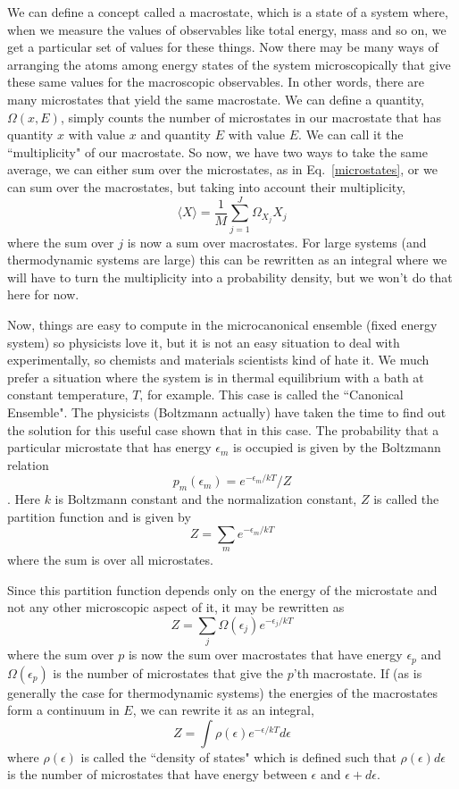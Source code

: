 \documentclass[]{revtex4}
\newcommand{\sm}[1]{{\[#1\]}}
\begin{document}
We can define a concept called a macrostate, which is a state of a system where, when we measure the values of observables like total energy, mass and
so on, we get a particular set of values for these things.  Now there may be many ways of arranging the atoms among energy states of the system
microscopically that give
these same values for the macroscopic observables. In other words, there are many microstates that yield the same macrostate.
We can define a quantity, $\Omega (x,E)$, simply counts the number of microstates in our macrostate
that has quantity $x$ with value $x$ and quantity $E$ with value $E$.  We can call it the ``multiplicity" of our macrostate.  So now,
we have two ways to take the same average, we can either sum over the microstates, as in Eq.~\ref{microstates}, or we can sum over the
macrostates, but taking into account their multiplicity,
\sm{\langle X\rangle=\frac{1}{M}{\sum_{j=1}^{J} \Omega_{X_j} X_j}\label{microstates}}
where the sum over $j$ is now a sum over macrostates.  For large systems (and thermodynamic systems are large) this can be rewritten as
an integral where we will have to turn the multiplicity into a probability density, but we won't do that here for now.

Now, things are easy to compute in the microcanonical ensemble (fixed energy system) so physicists love it,  but it is not
an easy situation to deal with experimentally, so chemists and materials scientists kind of hate it.
We much prefer a situation where the system is in thermal equilibrium with a bath at constant temperature, $T$, for example.
This case is called the ``Canonical Ensemble".  The physicists (Boltzmann actually) have taken the time to find out the solution for this
useful case shown that in this case. The probability that a particular microstate that has energy $\epsilon_m$ is
occupied is given by the Boltzmann relation
\sm{p_m(\epsilon_m)=e^{-\epsilon_m/kT}/Z}.
Here $k$ is Boltzmann constant and the normalization constant, $Z$ is called the partition function and is given by
\sm{Z = \sum_m e^{-\epsilon_m/kT}}
where the sum is over all microstates.

Since this partition function depends only on the energy of the microstate and not any other microscopic aspect of it, it may be rewritten as
\sm{Z = \sum_j \Omega(\epsilon_j)e^{-\epsilon_j/kT}}
where the sum over $p$ is now the sum over macrostates that have energy $\epsilon_p$ and $\Omega(\epsilon_p)$ is the number of microstates that give
the $p$'th macrostate.  If (as is generally the case for thermodynamic systems) the energies of the macrostates form a continuum in $E$, we can rewrite
it as an integral,
\sm{Z = \int \rho(\epsilon)e^{-\epsilon/kT}d\epsilon}
where $\rho(\epsilon)$ is called the ``density of states" which is defined such that $\rho(\epsilon)d\epsilon$ is the number of microstates
that have energy between $\epsilon$ and $\epsilon+d\epsilon$.
\end{document}
